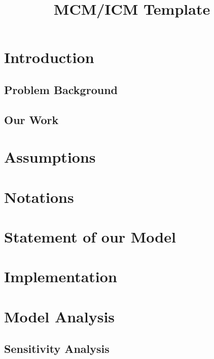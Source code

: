 \documentclass[12pt]{article} %
\title{MCM/ICM Template}
\begin{document}
\cfoot{}
\maketitle
\thispagestyle{fancy}
\tableofcontents %
\newpage %


\section{Introduction} %
\subsection{Problem Background} %




\subsection{Our Work} %


\section{Assumptions} %


\section{Notations} %



\section{Statement of our Model} %


\section{Implementation}	 %


\section{Model Analysis} %
\subsection{Sensitivity Analysis}
\end{document}
